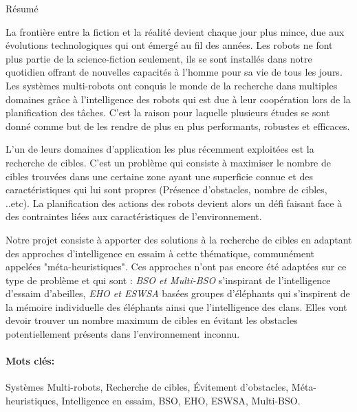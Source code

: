 \let\cleardoublepage\clearpage
\begin{poliabstract}{Résumé}

La frontière entre la fiction et la réalité devient chaque jour plus mince, due aux évolutions technologiques qui ont émergé au fil des années. Les robots ne font plus partie de la science-fiction seulement, ils se sont installés dans notre quotidien offrant de nouvelles capacités à l’homme pour sa vie de tous les jours.
Les systèmes multi-robots ont conquis le monde de la recherche dans multiples domaines grâce à l’intelligence des robots qui est due à leur coopération lors de la planification des tâches. C’est la raison pour laquelle plusieurs études se sont donné comme but de les rendre de plus en plus performants, robustes et efficaces.

L’un de leurs domaines d’application les plus récemment exploitées est la recherche de cibles. C’est un problème qui consiste à maximiser le nombre de cibles trouvées dans une certaine zone ayant une superficie connue et des caractéristiques qui lui sont propres (Présence d’obstacles, nombre de cibles, ..etc). La planification des actions des robots devient alors un défi faisant face à des contraintes liées aux caractéristiques de l’environnement.

Notre projet consiste à apporter des solutions à la recherche de cibles en adaptant des approches d’intelligence en essaim à cette thématique, communément appelées "méta-heuristiques". Ces approches n’ont pas encore été adaptées sur ce type de problème et qui sont :\textit{ BSO et Multi-BSO} s’inspirant de l’intelligence d’essaim d’abeilles, \textit{EHO et ESWSA} basées groupes d’éléphants qui s’inspirent de la mémoire individuelle des éléphants ainsi que l’intelligence des clans. Elles vont devoir trouver un nombre maximum de cibles en évitant les obstacles potentiellement présents dans l’environnement inconnu.
	\paragraph*{Mots clés:}
	Systèmes Multi-robots, Recherche de cibles, Évitement d'obstacles, Méta-heuristiques, Intelligence en essaim, BSO, EHO, ESWSA, Multi-BSO.
	
\end{poliabstract}

